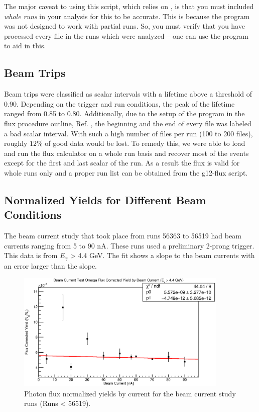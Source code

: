 The major caveat to using this script, which relies on , is that you must included \emph{whole runs} in your analysis for this to be accurate. This is because the  program was not designed to work with partial runs. So, you must verify that you have processed every file in the runs which were analyzed -- one can use the  program to aid in this.

\subsection{\label{sec:flux.trips}Beam Trips}

Beam trips were classified as scalar intervals with a lifetime above a threshold of 0.90. Depending on the trigger and run conditions, the peak of the lifetime ranged from 0.85 to 0.80. Additionally, due to the setup of the program in the flux procedure outline, Ref. \cite{clas.flux.note}, the beginning and the end of every file was labeled a bad scalar interval. With such a high number of files per run (100 to 200 files), roughly $12\%$ of good data would be lost. To remedy this, we were able to load and run the flux calculator on a whole run basis and recover most of the events except for the first and last scalar of the run. As a result the flux is valid for whole runs only and a proper run list can be obtained from the g12-flux script.

\FloatBarrier


\subsection{\label{sec:flux.normyields}Normalized Yields for Different Beam Conditions}
The beam current study that took place from runs 56363 to 56519 had beam currents ranging from 5 to 90 nA. These runs used a preliminary 2-prong trigger. This data is from $E_{\gamma}$ > 4.4 GeV. The fit shows a slope to the beam currents with an error larger than the slope.

\begin{figure}[h]
\begin{center}
 \includegraphics[width=0.9\textwidth]{figures/gflux/gflux_bycurrent_omega.eps}
  \caption{Photon flux normalized yields by current for the beam current study runs (Runs < 56519).}
  \label{gfluxbycurrent}
  \end{center}
\end{figure}
\FloatBarrier



